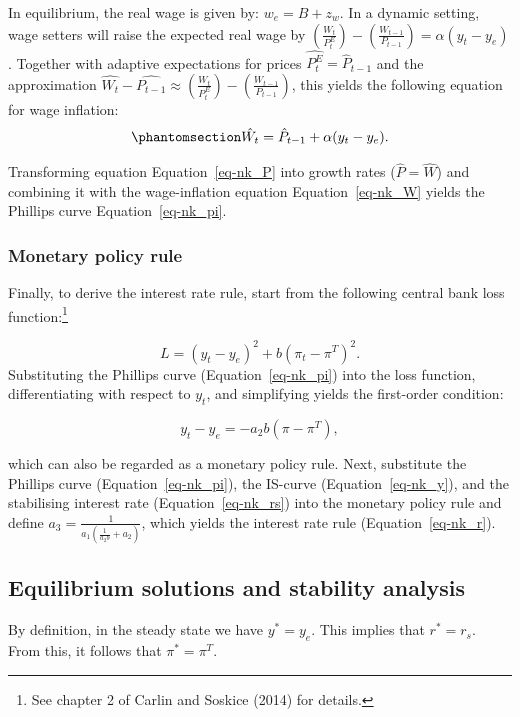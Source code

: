 \documentclass[
  letterpaper,
  DIV=11,
  numbers=noendperiod]{scrreprt}
\begin{document}
In equilibrium, the real wage is given by: \(w_e = B + z_w\). In a
dynamic setting, wage setters will raise the expected real wage by
\(\left(\frac{W_t}{P_{t}^E}\right) - \left(\frac{W_{t-1}}{P_{t-1}}\right)=\alpha(y_t - y_e)\).
Together with adaptive expectations for prices
\(\hat{P_t^E} = \hat{P}_{t-1}\) and the approximation
\(\hat{W_t} - \hat{P_{t-1}} \approx \left(\frac{W_t}{P_{t}^E}\right) - \left(\frac{W_{t-1}}{P_{t-1}}\right)\),
this yields the following equation for wage inflation:
\begin{equation}\phantomsection\label{eq-nk_W}{
\hat{W_t} = \hat{P}_{t-1} +\alpha(y_t - y_e).
}\end{equation}

Transforming equation Equation~\ref{eq-nk_P} into growth rates
(\(\hat{P}=\hat{W}\)) and combining it with the wage-inflation equation
Equation~\ref{eq-nk_W} yields the Phillips curve
Equation~\ref{eq-nk_pi}.

\subsubsection{Monetary policy rule}\label{monetary-policy-rule}

Finally, to derive the interest rate rule, start from the following
central bank loss function:\footnote{See chapter 2 of Carlin and Soskice
  (2014) for details.}

\[
L=(y_t-y_e)^2 + b(\pi_t - \pi^T)^2. 
\] Substituting the Phillips curve (Equation~\ref{eq-nk_pi}) into the
loss function, differentiating with respect to \(y_t\), and simplifying
yields the first-order condition:

\[
y_t-y_e = -a_2b(\pi-\pi^T),
\]

which can also be regarded as a monetary policy rule. Next, substitute
the Phillips curve (Equation~\ref{eq-nk_pi}), the IS-curve
(Equation~\ref{eq-nk_y}), and the stabilising interest rate
(Equation~\ref{eq-nk_rs}) into the monetary policy rule and define
\(a_3 = \frac{1}{a_1(\frac{1}{a_2b} + a_2)}\), which yields the interest
rate rule (Equation~\ref{eq-nk_r}).

\subsection{Equilibrium solutions and stability
analysis}\label{equilibrium-solutions-and-stability-analysis}

By definition, in the steady state we have \(y^*=y_e\). This implies
that \(r^*=r_s\). From this, it follows that \(\pi^* = \pi^T\).
\end{document}

